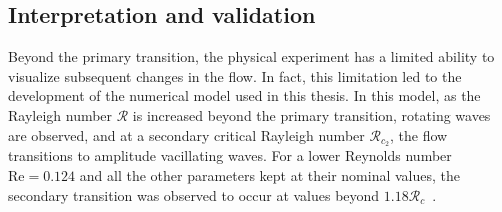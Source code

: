 \subsection{Interpretation and validation}
Beyond the primary transition, the physical experiment has a limited ability to visualize subsequent changes in the flow. In fact, this limitation led to the development of the numerical model used in this thesis. In this model, as the Rayleigh number $\mathcal{R}$ is increased beyond the primary transition, rotating waves are observed, and at a secondary critical Rayleigh number $\mathcal{R}_{c_2}$, the flow transitions to amplitude vacillating waves. For a lower Reynolds number $\mathrm{Re} = 0.124$ and all the other parameters kept at their nominal values, the secondary transition was observed to occur at values beyond $1.18\mathcal{R}_c$~\cite{PeiChunTsain}.

